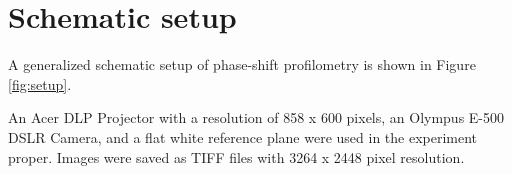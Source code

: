 \section{Schematic setup}

A generalized schematic setup of phase-shift profilometry is shown in Figure \ref{fig:setup}. 

An Acer DLP Projector with a resolution of 858 x 600 pixels, an Olympus E-500 DSLR Camera, and
a flat white reference plane were used in the experiment proper. Images were saved as TIFF files with 3264 x 2448 pixel resolution. 


